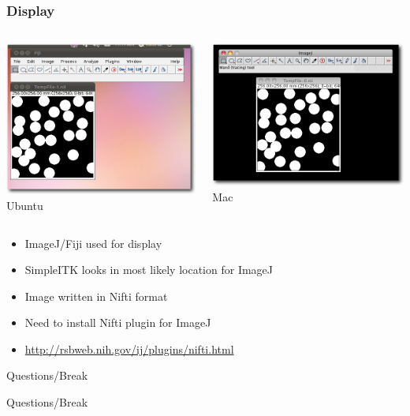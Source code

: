 \begin{frame}[fragile]
\frametitle{Display}
\begin{columns}[c]
\begin{center}
\includegraphics[width=1\textwidth]{Images/ImageDisplay_shadow} \\
Ubuntu
\end{center}
\begin{center}
\includegraphics[width=1\textwidth]{Images/ImageDisplayMac_shadow} \\
Mac
\end{center}
\end{columns}
\begin{itemize}
  \item ImageJ/Fiji used for display
  \item SimpleITK looks in most likely location for ImageJ
  \item Image written in Nifti format
  \item Need to install Nifti plugin for ImageJ
  \item \url{http://rsbweb.nih.gov/ij/plugins/nifti.html}
\end{itemize}
\end{frame}

\begin{frame}{Questions/Break}
\fontsize{36pt}{36pt}\selectfont
\center
\begin{center}
Questions/Break
\end{center}
\end{frame}


